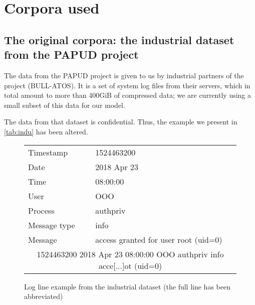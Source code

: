 \chapter{Corpora used}

\section{The original corpora: the industrial dataset from the PAPUD project}
The data from the PAPUD project is given to us by industrial partners of the project (BULL-ATOS). It is a set of system log files from their servers, which in total amount to more than 400GiB of compressed data; we are currently using a small subset of this data for our model.

The data from that dataset is confidential. Thus, the example we present in \autoref{tab:indu} has been altered.


\begin{figure}[!h]
	\begin{center}
		
		\begin{tabularx}{.9\textwidth}{|X|X|}
			\hline 
			Timestamp & 1524463200\\
			Date &2018 Apr 23\\
			Time &08:00:00\\
			User&OOO\\
			Process &authpriv\\
			Message type&info\\
			Message& access granted for user root (uid=0)\\ 
			\hline 
			\multicolumn{2}{|c|}{1524463200 2018 Apr 23 08:00:00 OOO authpriv info acce[...]ot (uid=0)} \\ 
			\hline 
		\end{tabularx} 
	\end{center}
	\caption{Log line example from the industrial dataset (the full line has been abbreviated) \label{tab:indu}}
\end{figure}

